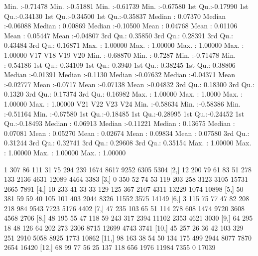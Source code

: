 \documentclass[a4paper]{ article}
\begin{document}
\begin{table}[H]
\begin{Schunk}
\begin{Soutput}
 Min.   :-0.71478   Min.   :-0.51881   Min.   :-0.61739   Min.   :-0.67580  
 1st Qu.:-0.17990   1st Qu.:-0.34130   1st Qu.:-0.34500   1st Qu.:-0.35837  
 Median : 0.07370   Median :-0.06088   Median : 0.00869   Median :-0.10500  
 Mean   : 0.04768   Mean   : 0.01106   Mean   : 0.05447   Mean   :-0.04807  
 3rd Qu.: 0.35850   3rd Qu.: 0.28391   3rd Qu.: 0.43484   3rd Qu.: 0.16871  
 Max.   : 1.00000   Max.   : 1.00000   Max.   : 1.00000   Max.   : 1.00000  
      V17                V18               V19                V20          
 Min.   :-0.68870   Min.   :-0.7287   Min.   :-0.71478   Min.   :-0.54186  
 1st Qu.:-0.34109   1st Qu.:-0.3940   1st Qu.:-0.38245   1st Qu.:-0.38806  
 Median :-0.01391   Median :-0.1130   Median :-0.07632   Median :-0.04371  
 Mean   :-0.02777   Mean   :-0.0717   Mean   :-0.07138   Mean   :-0.04832  
 3rd Qu.: 0.18300   3rd Qu.: 0.1320   3rd Qu.: 0.17374   3rd Qu.: 0.16982  
 Max.   : 1.00000   Max.   : 1.0000   Max.   : 1.00000   Max.   : 1.00000  
      V21                V22                V23                V24          
 Min.   :-0.58634   Min.   :-0.58386   Min.   :-0.51164   Min.   :-0.67580  
 1st Qu.:-0.18485   1st Qu.:-0.28995   1st Qu.:-0.24452   1st Qu.:-0.18493  
 Median : 0.06913   Median :-0.11221   Median : 0.13675   Median : 0.07081  
 Mean   : 0.05270   Mean   : 0.02674   Mean   : 0.09834   Mean   : 0.07580  
 3rd Qu.: 0.31244   3rd Qu.: 0.32741   3rd Qu.: 0.29608   3rd Qu.: 0.35154  
 Max.   : 1.00000   Max.   : 1.00000   Max.   : 1.00000   Max.   : 1.00000  
\end{Soutput}
\begin{Soutput}
      [,1] [,2] [,3] [,4] [,5] [,6] [,7] [,8] [,9] [,10] [,11] [,12] [,13]
 [1,]    1  307   86  111   31   75  294  239 1674  8617  9252  6305  5304
 [2,]   12  200   79   61   83   51  278  133 2136  4631 12089  4464  3383
 [3,]    0  350   52   74   53  119  203  258 3123  3105 15731  2665  7891
 [4,]   10  233   41   33   33  129  125  367 2107  4311 13229  1074 10898
 [5,]   50  381   59   59   40  105  101  403 2044  8326 11552  3575 14149
 [6,]    3  115   75   77   47   82  208  218  984  9543  7723  5176  4402
 [7,]   47  235  103   65   51  114  278  608 1474  9720  3608  4568  2706
 [8,]   48  195   55   47  118   59  243  317 2394 11102  2353  4621  3030
 [9,]   64  295   18   48  126   64  202  273 2306  8715 12699  4743  3741
[10,]   45  257   26   36   42  103  329  251 2910  5058  8925  1773 10862
[11,]   98  163   38   54   50  134  175  499 2944  8077  7870  2654 16420
[12,]   68   99   77   56   25  137  118  656 1976 11984  7355     0 17039

\end{Soutput}
\end{Schunk}
\end{table}
\end{document}
